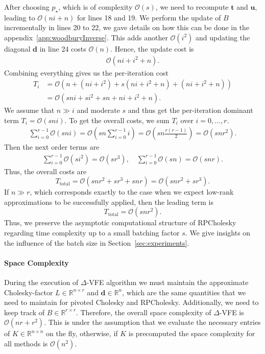 \documentclass[onefignum,onetabnum]{siamart250211}
\newcommand{\R}{\mathbb{R}}
\begin{document}
After choosing $p_\star$, which is of complexity $\mathcal{O}(s)$, we need to recompute $\bm{t}$ and $\bm{u}$, leading to $\mathcal{O}(ni+n)$ for lines 18 and 19. We perform the update of $B$ incrementally in lines 20 to 22, we gave details on how this can be done in the appendix~\ref{app:woodburyInverse}. This adds another $\mathcal{O}(i^2)$ and updating the diagonal $\bm{d}$ in line 24 costs $\mathcal{O}(n)$. Hence, the update cost is
\begin{align*}
    \mathcal{O}(ni+i^2 +n).
\end{align*}
Combining everything gives us the per-iteration cost 
\begin{align*}
    T_i &= \mathcal{O}(n + (ni + i^2) + s(ni+i^2+n) + (ni + i^2 +n)) \\
    &= \mathcal{O}(sni+si^2 +sn + ni+ i^2 +n).
\end{align*}
We assume that $n\gg i$ and moderate $s$ and thus get the per-iteration dominant term $T_i = \mathcal{O}(sni)$.
To get the overall costs, we sum $T_i$ over $i=0,\hdots, r$.
\begin{align*}
    \sum_{i=0}^{r-1}\mathcal{O}(sni) = \mathcal{O}\left( sn\sum_{i=0}^{r-1}i\right) = \mathcal{O}\left(sn\frac{r(r-1)}{2} \right) = \mathcal{O}(snr^2).
\end{align*}
Then the next order terms are 
\begin{align*}
    \sum_{i=0}^{r-1} \mathcal{O}(si^2) = \mathcal{O}(sr^3), \quad \sum_{i=0}^{r-1}\mathcal{O}(sn) = \mathcal{O}(snr).
\end{align*}
Thus, the overall costs are
\begin{equation*}
    T_{\text{total}} = \mathcal{O}(snr^2 + sr^3 + snr) = \mathcal{O}(snr^2 + sr^3).
\end{equation*}
If $n \gg r$, which corresponds exactly to the case when we expect low-rank approximations to be successfully applied, then the leading term is
\begin{equation*}
    T_{\text{total}} = \mathcal{O}(snr^2).
\end{equation*}
Thus, we preserve the asymptotic computational structure of RPCholesky regarding time complexity up to a small batching factor $s$. We give insights on the influence of the batch size in Section~\ref{sec:experiments}.
\paragraph{Space Complexity}
During the execution of $\Delta$-VFE algorithm we must maintain the approximate Cholesky-factor $L \in \R^{n\times r}$ and $\bm{d} \in \R^n$, which are the same quantities that we need to maintain for pivoted Cholesky and RPCholesky. Additionally, we need to keep track of $B \in \R^{r\times r}$. Therefore, the overall space complexity of $\Delta$-VFE is $\mathcal{O}(nr + r^2)$. This is under the assumption that we evaluate the necessary entries of $K \in \R^{n \times n}$ on the fly, otherwise, if $K$ is precomputed the space complexity for all methods is $\mathcal{O}(n^2)$.



\newpage
\newpage
\newpage
\end{document}
